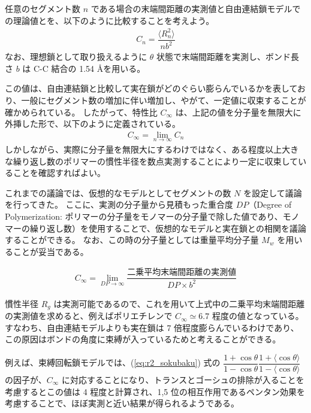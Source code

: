 \documentclass[11pt]{jsarticle}
\begin{document}
任意のセグメント数 $n$ である場合の末端間距離の実測値と自由連結鎖モデルでの理論値とを、以下のように比較することを考えよう。
\begin{align}
C_n=\dfrac{ \langle R_n^2 \rangle }{n b^2}
\end{align}
なお、理想鎖として取り扱えるように $\theta$ 状態で末端間距離を実測し、ボンド長さ $b$ は C-C 結合の 1.54 \AA を用いる。

この値は、自由連結鎖と比較して実在鎖がどのぐらい膨らんでいるかを表しており、一般にセグメント数の増加に伴い増加し、やがて、一定値に収束することが確かめられている。
したがって、特性比 $C_{\infty}$ は、上記の値を分子量を無限大に外挿した形で、以下のように定義されている。
\begin{align}
C_{\infty}=\lim_{n \to \infty} C_n 
\label{fig:CR}
\end{align}
しかしながら、実際に分子量を無限大にするわけではなく、ある程度以上大きな繰り返し数のポリマーの慣性半径を数点実測することにより一定に収束していることを確認すればよい。

これまでの議論では、仮想的なモデルとしてセグメントの数 $N$ を設定して議論を行ってきた。
ここに、実測の分子量から見積もった重合度 $DP$（Degree of Polymerization: ポリマーの分子量をモノマーの分子量で除した値であり、モノマーの繰り返し数）を使用することで、仮想的なモデルと実在鎖との相関を議論することができる。
なお、この時の分子量としては重量平均分子量 $M_w$ を用いることが妥当である。

\begin{align}
C_{\infty} = \lim_{DP \to \infty} \dfrac{ \text{二乗平均末端間距離の実測値} }{DP \times b^2}
\label{fig:CR}
\end{align}

慣性半径 $R_g$ は実測可能であるので、これを用いて上式中の二乗平均末端間距離の実測値を求めると、例えばポリエチレンで $C_{\infty} \simeq 6.7$ 程度の値となっている。
すなわち、自由連結モデルよりも実在鎖は 7 倍程度膨らんでいるわけであり、この原因はボンドの角度に束縛が入っているためと考えることができる。

例えば、束縛回転鎖モデルでは、(\ref{eq:r2_sokubaku}) 式の $\dfrac{1+\cos \theta}{1-\cos \theta} \dfrac{1+ \langle \cos \theta \rangle}{1- \langle \cos \theta \rangle}$ の因子が、$C_{\infty}$ に対応することになり、トランスとゴーシュの排除が入ることを考慮するとこの値は 4 程度と計算され、1,5 位の相互作用であるペンタン効果を考慮することで、ほぼ実測と近い結果が得られるようである。
\end{document}
